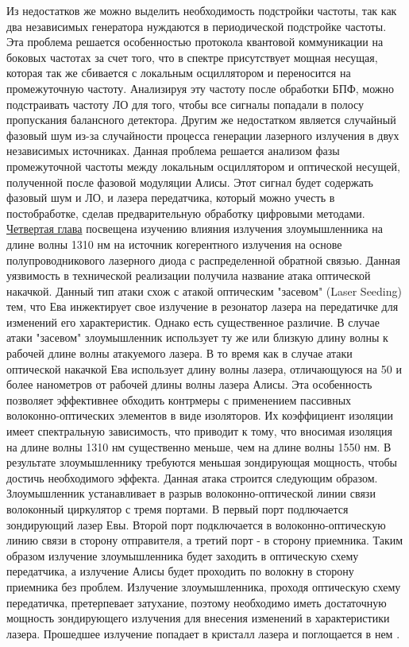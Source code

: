 \newline Из недостатков же можно выделить необходимость подстройки частоты, так как два независимых генератора нуждаются в периодической подстройке частоты. Эта проблема решается особенностью протокола квантовой коммуникации на боковых частотах за счет того, что в спектре присутствует мощная несущая, которая так же сбивается с локальным осциллятором и переносится на промежуточную частоту. Анализируя эту частоту после обработки БПФ, можно подстраивать частоту ЛО для того, чтобы все сигналы попадали в полосу пропускания балансного детектора. Другим же недостатком является случайный фазовый шум из-за случайности процесса генерации лазерного излучения в двух независимых источниках. Данная проблема решается анализом фазы промежуточной частоты между локальным осциллятором и оптической несущей, полученной после фазовой модуляции Алисы. Этот сигнал будет содержать фазовый шум и ЛО, и лазера передатчика, который можно учесть в постобработке, сделав предварительную обработку цифровыми методами. 
\newpage \underline{Четвертая глава} посвещена изучению влияния излучения злоумышленника на длине волны 1310 нм на источник когерентного излучения на основе полупроводникового лазерного диода с распределенной обратной связью. Данная уязвимость в технической реализации получила название атака оптической накачкой\cite{fadeev2024b,fadeev2025}. Данный тип атаки схож с атакой оптическим "засевом" (Laser Seeding) \cite{huang2019,lovic2023} тем, что Ева инжектирует свое излучение в резонатор лазера на передатичке для изменений его характеристик. Однако есть существенное различие. В случае атаки "засевом" злоумышленник использует ту же или близкую длину волны к рабочей длине волны атакуемого лазера. В то время как в случае атаки оптической накачкой Ева использует длину волны лазера, отличающуюся на 50 и более нанометров от рабочей длины волны лазера Алисы. Эта особенность позволяет эффективнее обходить контрмеры с применением пассивных волоконно-оптических элементов в виде изоляторов\cite{borisova2020,nasedkin2022,nasedkin2023}. Их коэффициент изоляции имеет спектральную зависимость, что приводит к тому, что вносимая изоляция на длине волны 1310 нм существенно меньше, чем на длине волны 1550 нм. В результате злоумышленнику требуются меньшая зондирующая мощность, чтобы достичь необходимого эффекта. 
\newline Данная атака строится следующим образом. Злоумышленник устанавливает в разрыв волоконно-оптической линии связи волоконный циркулятор с тремя портами. В первый порт подлючается зондирующий лазер Евы. Второй порт подключается в волоконно-оптическую линию связи в сторону отправителя, а третий порт - в сторону приемника. Таким образом излучение злоумышленника будет заходить в оптическую схему передатчика, а излучение Алисы будет проходить по волокну в сторону приемника без проблем. Излучение злоумышленника, проходя оптическую схему передатичка, претерпевает затухание, поэтому необходимо иметь достаточную мощность зондирующего излучения для внесения изменений в характеристики лазера. Прошедшее излучение попадает в кристалл лазера и поглощается в нем \cite{hui2023}.
